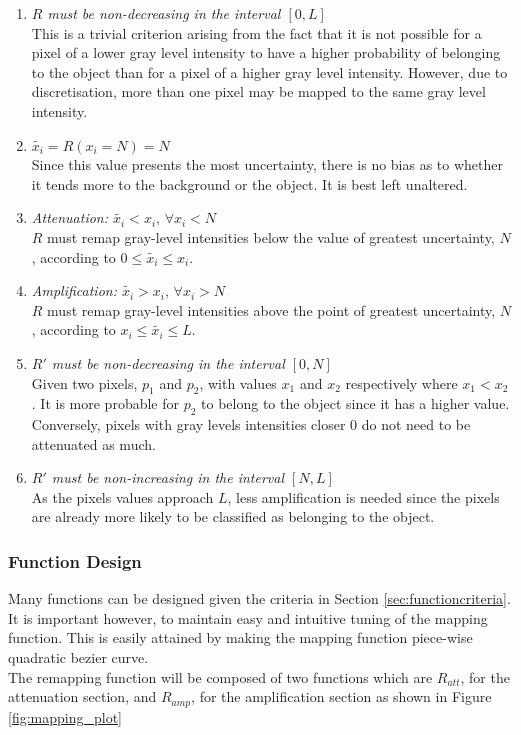 \documentclass[a4paper,11pt]{ijamas}
\begin{document}
\begin{enumerate}
\item{}
\textit{$R$ must be non-decreasing in the interval $[0, L]$}\\
This is a trivial criterion arising from the fact that it is not possible for a pixel of a lower gray level intensity to have a higher probability of belonging to the object than for a pixel of a higher gray level intensity. However, due to discretisation, more than one pixel may be mapped to the same gray level intensity.

\item
\textit{$\widetilde{x_i} = R(x_i=N) = N$}\\
Since this value presents the most uncertainty, there is no bias as to whether it tends more to the background or the object. It is best left unaltered.

\item
\textit{Attenuation: $\widetilde{x_i} < x_i, \, \forall x_i<N$}\\
$R$ must remap gray-level intensities below the value of greatest uncertainty, $N$, according to $0 \leq \widetilde{x_i} \leq x_i$.

\item
\textit{Amplification: $\widetilde{x_i} > x_i, \, \forall x_i>N$}\\
$R$ must remap gray-level intensities above the point of greatest uncertainty, $N$, according to $x_i \leq \widetilde{x_i} \leq L$.

\item
\textit{$R'$ must be non-decreasing in the interval $[0,N]$}\\
Given two pixels, $p_1$ and $p_2$, with values $x_1$ and $x_2$ respectively where $x_1<x_2$. It is more probable for $p_2$ to belong to the object since it has a higher value. Conversely, pixels with gray levels intensities closer $0$ do not need to be attenuated as much.

\item
\textit{$R'$ must be non-increasing in the interval $[N,L]$}\\
As the pixels values approach $L$, less amplification is needed since the pixels are already more likely to be classified as belonging to the object.

\end{enumerate}
\subsubsection{Function Design}
Many functions can be designed given the criteria in Section \ref{sec:functioncriteria}. It is important however, to maintain easy and intuitive tuning of the mapping function. This is easily attained by making the mapping function piece-wise quadratic bezier curve.
\\
The remapping function will be composed of two functions which are $R_{att}$, for the attenuation section, and $R_{amp}$, for the amplification section as shown in Figure \ref{fig:mapping_plot}
\end{document}
